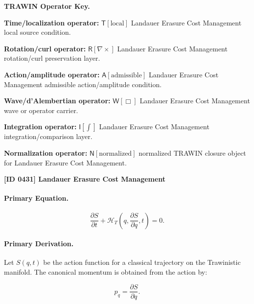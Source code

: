 \par\vspace{0.45\baselineskip}
\noindent\begin{minipage}[t]{\linewidth}
\begingroup
\small
\raggedright
\textbf{TRAWIN Operator Key.}\par
\noindent\textbf{Time/localization operator:} $\mathsf{T}\!\left[\mathrm{local}\right]$ Landauer Erasure Cost Management local source condition.\par
\noindent\textbf{Rotation/curl operator:} $\mathsf{R}\!\left[\nabla\times\right]$ Landauer Erasure Cost Management rotation/curl preservation layer.\par
\noindent\textbf{Action/amplitude operator:} $\mathsf{A}\!\left[\mathrm{admissible}\right]$ Landauer Erasure Cost Management admissible action/amplitude condition.\par
\noindent\textbf{Wave/d'Alembertian operator:} $\mathsf{W}\!\left[\Box\right]$ Landauer Erasure Cost Management wave or operator carrier.\par
\noindent\textbf{Integration operator:} $\mathsf{I}\!\left[\int\right]$ Landauer Erasure Cost Management integration/comparison layer.\par
\noindent\textbf{Normalization operator:} $\mathsf{N}\!\left[\mathrm{normalized}\right]$ normalized TRAWIN closure object for Landauer Erasure Cost Management.\par
\endgroup
\end{minipage}

\clearpage
\noindent\textbf{[ID 0431] Landauer Erasure Cost Management}\par
\vspace{0.35em}
\paragraph{Primary Equation.}
\begin{equation}
\frac{\partial S}{\partial t}
+
\mathcal{H}_T
\left(
q,\frac{\partial S}{\partial q},t
\right)
=
0 .
\end{equation}

\paragraph{Primary Derivation.}
Let $S(q,t)$ be the action function for a classical trajectory on the Trawinistic manifold.  
The canonical momentum is obtained from the action by:

\begin{equation}
p_q=\frac{\partial S}{\partial q}.
\end{equation}

